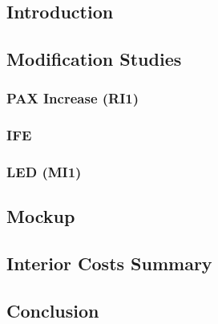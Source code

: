 \subsection{Introduction}
    

\subsection{Modification Studies}
    \subsubsection{PAX Increase (RI1)}
        
    \subsubsection{IFE}
        
    \subsubsection{LED (MI1)}
        

\subsection{Mockup}
    

\subsection{Interior Costs Summary}
    

\subsection{Conclusion}
    
